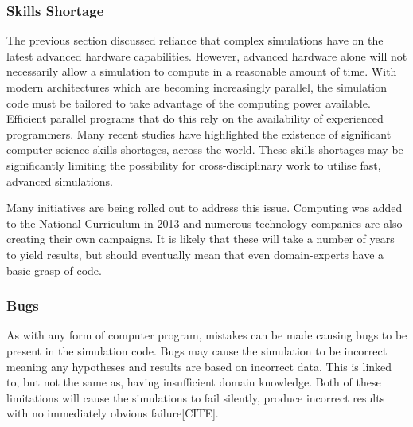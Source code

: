 \documentclass{UoYCSproject}
\begin{document}
\subsubsection{Skills Shortage}
\label{skills_shortage}
The previous section discussed reliance that complex simulations have on the latest advanced hardware capabilities.
However, advanced hardware alone will not necessarily allow a simulation to compute in a reasonable amount of time. 
With modern architectures which are becoming increasingly parallel, the simulation code must be tailored to take advantage of the computing power available.
Efficient parallel programs that do this rely on the availability of experienced programmers.
Many recent studies have highlighted the existence of significant computer science skills shortages, across the world\cite{digital_skills_uk, microsoft_blog}.
These skills shortages may be significantly limiting the possibility for cross-disciplinary work to utilise fast, advanced simulations.



Many initiatives are being rolled out to address this issue.
Computing was added to the National Curriculum in 2013\cite{national_curriculum, teacher_training} and numerous technology companies are also creating their own campaigns\cite{apple_education, microsoft_education}.
It is likely that these will take a number of years to yield results, but should eventually mean that even domain-experts have a basic grasp of code.

\subsubsection{Bugs}
As with any form of computer program, mistakes can be made causing bugs to be present in the simulation code.
Bugs may cause the simulation to be incorrect meaning any hypotheses and results are based on incorrect data.
This is linked to, but not the same as, having insufficient domain knowledge.
Both of these limitations will cause the simulations to fail silently, produce incorrect results with no immediately obvious failure[CITE].
\end{document}
